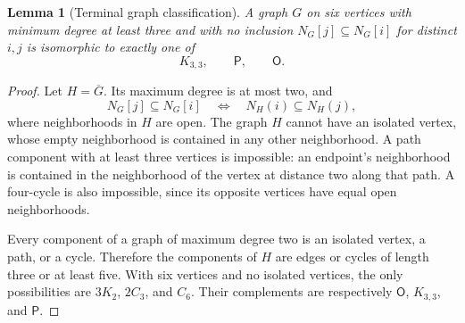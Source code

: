 \documentclass[11pt,a4paper]{article}
\newtheorem{lemma}[theorem]{Lemma}
\theoremstyle{definition}
\newcommand{\OO}{\mathsf{O}}
\newcommand{\PP}{\mathsf{P}}
\begin{document}
\begin{lemma}[Terminal graph classification]\label{lem:classification}
A graph $G$ on six vertices with minimum degree at least three and with no inclusion $N_G[j]\subseteq N_G[i]$ for distinct $i,j$ is isomorphic to exactly one of
\[
 K_{3,3},\qquad \PP,\qquad \OO.
\]
\end{lemma}
\begin{proof}
Let $H=\overline G$. Its maximum degree is at most two, and
\[
 N_G[j]\subseteq N_G[i]\quad\Longleftrightarrow\quad
 N_H(i)\subseteq N_H(j),
\]
where neighborhoods in $H$ are open. The graph $H$ cannot have an isolated vertex, whose empty neighborhood is contained in any other neighborhood. A path component with at least three vertices is impossible: an endpoint's neighborhood is contained in the neighborhood of the vertex at distance two along that path. A four-cycle is also impossible, since its opposite vertices have equal open neighborhoods.

Every component of a graph of maximum degree two is an isolated vertex, a path, or a cycle. Therefore the components of $H$ are edges or cycles of length three or at least five. With six vertices and no isolated vertices, the only possibilities are $3K_2$, $2C_3$, and $C_6$. Their complements are respectively $\OO$, $K_{3,3}$, and $\PP$.
\end{proof}
\end{document}
